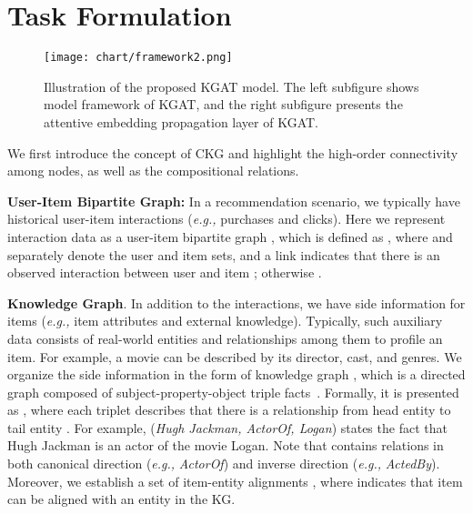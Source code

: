 \documentclass[sigconf]{acmart}
\newcommand{\eg}{\emph{e.g., }}
\theoremstyle{definition}
\begin{document}
 \section{Task Formulation}

\begin{figure*}[ht]
    \centering
	\texttt{[image: chart/framework2.png]}
	\vspace{-10pt}
	\caption{Illustration of the proposed KGAT model. The left subfigure shows model framework of KGAT, and the right subfigure presents the attentive embedding propagation layer of KGAT.}
	\label{fig:framework}
	\vspace{-10pt}
\end{figure*}

We first introduce the concept of CKG and highlight the high-order connectivity among nodes, as well as the compositional relations.


\vspace{5px}
\noindent\textbf{User-Item Bipartite Graph:}
In a recommendation scenario, we typically have historical user-item interactions (\eg purchases and clicks).
Here we represent interaction data as a user-item bipartite graph , which is defined as , where  and  separately denote the user and item sets, and a link  indicates that there is an observed interaction between user  and item ; otherwise .

\vspace{5px}
\noindent\textbf{Knowledge Graph}.
In addition to the interactions, we have side information for items (\eg item attributes and external knowledge).
Typically, such auxiliary data consists of real-world entities and relationships among them to profile an item.
For example, a movie can be described by its director, cast, and genres.
We organize the side information in the form of knowledge graph , which is a directed graph composed of subject-property-object triple facts~\cite{KTUP}.
Formally, it is presented as , where each triplet describes that there is a relationship  from head entity  to tail entity .
For example, (\emph{Hugh Jackman, ActorOf, Logan}) states the fact that Hugh Jackman is an actor of the movie Logan.
Note that  contains relations in both canonical direction (\eg \emph{ActorOf}) and inverse direction (\eg \emph{ActedBy}).
Moreover, we establish a set of item-entity alignments , where  indicates that item  can be aligned with an entity  in the KG.
\end{document}
